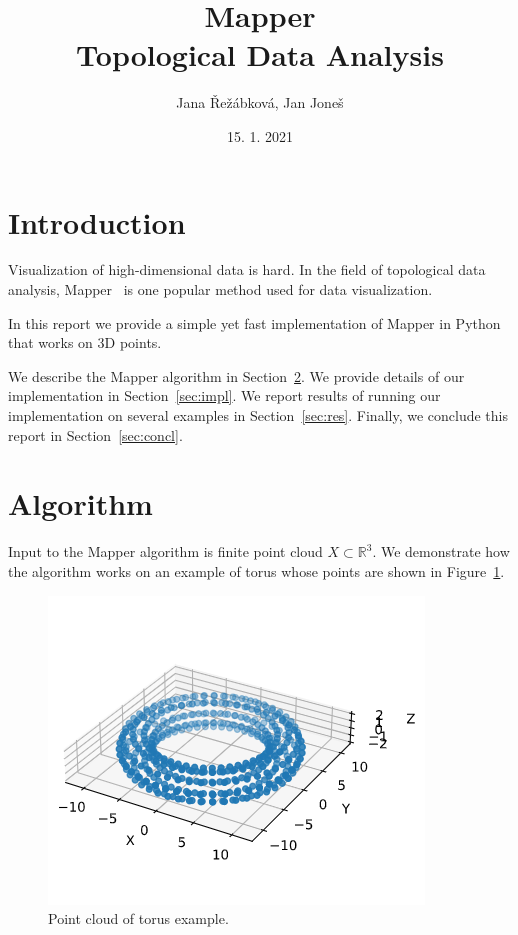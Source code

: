 \documentclass{article}
\title{\vspace{-4cm} Mapper \\ \vspace{0.2cm} \large Topological Data Analysis}
\author{Jana Řežábková, Jan Joneš}
\date{15. 1. 2021}
\begin{document}
\maketitle

\section{Introduction}

Visualization of high-dimensional data is hard.
In the field of topological data analysis, Mapper~\cite{mapper} is one popular method used for data visualization.

In this report we provide a simple yet fast implementation of Mapper in Python that works on 3D points.

We describe the Mapper algorithm in Section~\ref{sec:alg}.
We provide details of our implementation in Section~\ref{sec:impl}.
We report results of running our implementation on several examples in Section~\ref{sec:res}.
Finally, we conclude this report in Section~\ref{sec:concl}.

\section{Algorithm}\label{sec:alg}

Input to the Mapper algorithm is finite point cloud $X \subset \mathbb{R}^3$.
We demonstrate how the algorithm works on an example of torus whose points are shown in Figure~\ref{fig:torus-points}.

\begin{figure}[ht]
    \centering
    \includegraphics[width=0.7\columnwidth]{torus-point-cloud}
    \caption{Point cloud of torus example.}
    \label{fig:torus-points}
\end{figure}
\end{document}
